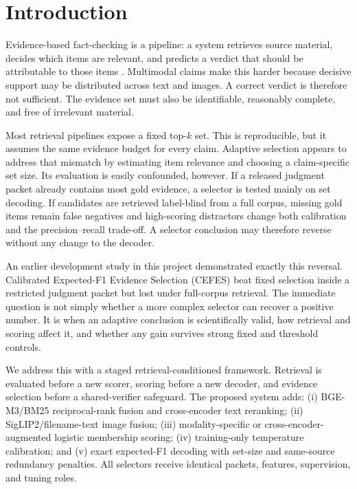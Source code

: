 \section{Introduction}

Evidence-based fact-checking is a pipeline: a system retrieves source material, decides which items are relevant, and predicts a verdict that should be attributable to those items \cite{zeng2021automated,zhou2020survey}. Multimodal claims make this harder because decisive support may be distributed across text and images. A correct verdict is therefore not sufficient. The evidence set must also be identifiable, reasonably complete, and free of irrelevant material.

Most retrieval pipelines expose a fixed top-$k$ set. This is reproducible, but it assumes the same evidence budget for every claim. Adaptive selection appears to address that mismatch by estimating item relevance and choosing a claim-specific set size. Its evaluation is easily confounded, however. If a released judgment packet already contains most gold evidence, a selector is tested mainly on set decoding. If candidates are retrieved label-blind from a full corpus, missing gold items remain false negatives and high-scoring distractors change both calibration and the precision--recall trade-off. A selector conclusion may therefore reverse without any change to the decoder.

An earlier development study in this project demonstrated exactly this reversal. Calibrated Expected-F1 Evidence Selection (CEFES) beat fixed selection inside a restricted judgment packet but lost under full-corpus retrieval. The immediate question is not simply whether a more complex selector can recover a positive number. It is when an adaptive conclusion is scientifically valid, how retrieval and scoring affect it, and whether any gain survives strong fixed and threshold controls.

We address this with a staged retrieval-conditioned framework. Retrieval is evaluated before a new scorer, scoring before a new decoder, and evidence selection before a shared-verifier safeguard. The proposed \method{} system adds: (i) BGE-M3/BM25 reciprocal-rank fusion and cross-encoder text reranking; (ii) SigLIP2/filename-text image fusion; (iii) modality-specific or cross-encoder-augmented logistic membership scoring; (iv) training-only temperature calibration; and (v) exact expected-F1 decoding with set-size and same-source redundancy penalties. All selectors receive identical packets, features, supervision, and tuning roles.

